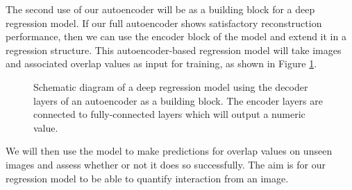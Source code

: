 The second use of our autoencoder will be as a building block for a deep regression model. If our full autoencoder shows satisfactory reconstruction performance, then we can use the encoder block of the model and extend it in a regression structure. This autoencoder-based regression model will take images and associated overlap values as input for training, as shown in Figure \ref{fig:regression}.

\begin{figure}[ht]
    \centering
    \caption{Schematic diagram of a deep regression model using the decoder layers of an autoencoder as a building block. The encoder layers are connected to fully-connected layers which will output a numeric value.}
    \label{fig:regression}
\end{figure}

We will then use the model to make predictions for overlap values on unseen images and assess whether or not it does so successfully. The aim is for our regression model to be able to quantify interaction from an image.
